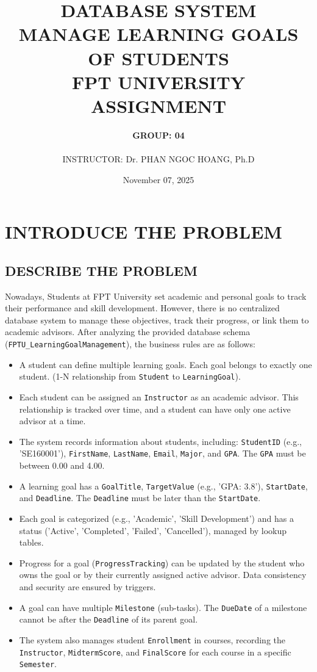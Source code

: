 \documentclass[12pt,a4paper]{report}
\title{
    \textbf{DATABASE SYSTEM}\\
    \textbf{MANAGE LEARNING GOALS OF STUDENTS}\\
    \textbf{FPT UNIVERSITY}\\
    \vspace{2cm}
    \LARGE ASSIGNMENT
}
\author{
    \textbf{GROUP: 04}\\[0.5cm]
    \makebox[\textwidth][3]{
        \begin{tabular}{l}
        STUDENT NAME: VU HONG QUAN | HE19xxxx\\
        STUDENT NAME: NGUYEN VIET HOANG  | HE19xxxx\\
        STUDENT NAME: PHAN CONG MINH THANH  | HE19xxxx
        \end{tabular}
    }\\[1cm]
    INSTRUCTOR: Dr. PHAN NGOC HOANG, Ph.D
}
\date{November 07, 2025}
\begin{document}
\maketitle
\newpage

\tableofcontents
\newpage


\chapter{INTRODUCE THE PROBLEM}

\section{DESCRIBE THE PROBLEM}

Nowadays, Students at FPT University set academic and personal goals to track their performance and skill development. However, there is no centralized database system to manage these objectives, track their progress, or link them to academic advisors. After analyzing the provided database schema (\verb|FPTU_LearningGoalManagement|), the business rules are as follows:

\begin{itemize}
    \item A student can define multiple learning goals. Each goal belongs to exactly one student. (1-N relationship from \verb|Student| to \verb|LearningGoal|).
    \item Each student can be assigned an \verb|Instructor| as an academic advisor. This relationship is tracked over time, and a student can have only one active advisor at a time.
    \item The system records information about students, including: \verb|StudentID| (e.g., 'SE160001'), \verb|FirstName|, \verb|LastName|, \verb|Email|, \verb|Major|, and \verb|GPA|. The \verb|GPA| must be between 0.00 and 4.00.
    \item A learning goal has a \verb|GoalTitle|, \verb|TargetValue| (e.g., 'GPA: 3.8'), \verb|StartDate|, and \verb|Deadline|. The \verb|Deadline| must be later than the \verb|StartDate|.
    \item Each goal is categorized (e.g., 'Academic', 'Skill Development') and has a status ('Active', 'Completed', 'Failed', 'Cancelled'), managed by lookup tables.
    \item Progress for a goal (\verb|ProgressTracking|) can be updated by the student who owns the goal or by their currently assigned active advisor. Data consistency and security are ensured by triggers.
    \item A goal can have multiple \verb|Milestone| (sub-tasks). The \verb|DueDate| of a milestone cannot be after the \verb|Deadline| of its parent goal.
    \item The system also manages student \verb|Enrollment| in courses, recording the \verb|Instructor|, \verb|MidtermScore|, and \verb|FinalScore| for each course in a specific \verb|Semester|.
\end{itemize}
\end{document}
